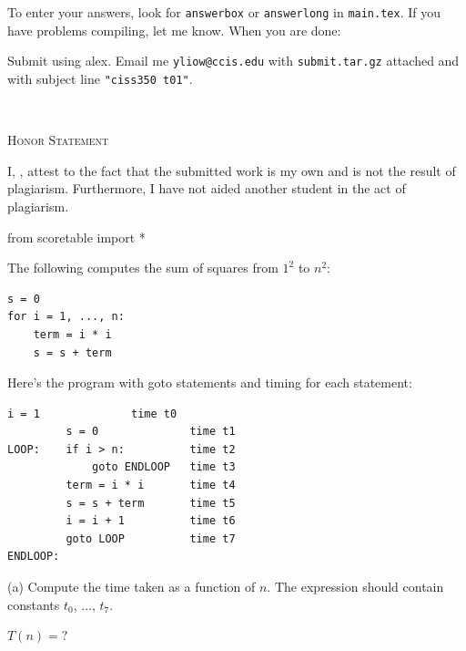 



To enter your answers, look for \verb!answerbox! or \verb!answerlong!
in \verb!main.tex!.
If you have problems compiling, let me know.
When you are done:
\begin{enumerate}
  \li Submit using alex.
  \li Email me \verb!yliow@ccis.edu! with \verb!submit.tar.gz! attached and with
  subject line \verb!"ciss350 t01"!.
\end{enumerate}

\mbox{}\\

\begin{center}
  \textsc{Honor Statement}
\end{center}
I, ,
attest to the fact that the submitted work is my own and
is not the result of plagiarism.
Furthermore, I have not aided another student in the act of
plagiarism.



\begin{python}
from scoretable import *
\end{python}

\newpage


\newpage
\nextq %

The following computes the sum of squares from $1^2$ to $n^2$:
\begin{Verbatim}[frame=single]
s = 0
for i = 1, ..., n:
    term = i * i
    s = s + term
\end{Verbatim}
Here's the program with goto statements and timing for each statement:
\begin{Verbatim}[frame=single]
         i = 1              time t0
         s = 0              time t1
LOOP:    if i > n:          time t2
             goto ENDLOOP   time t3
         term = i * i       time t4
         s = s + term       time t5
         i = i + 1          time t6
         goto LOOP          time t7
ENDLOOP:
\end{Verbatim}
(a) Compute the time taken as a function of $n$.
The expression should contain constants $t_0$, ..., $t_7$.
\\
\ANSWER
\begin{answerlong}
$T(n) = ?$
\end{answerlong}

